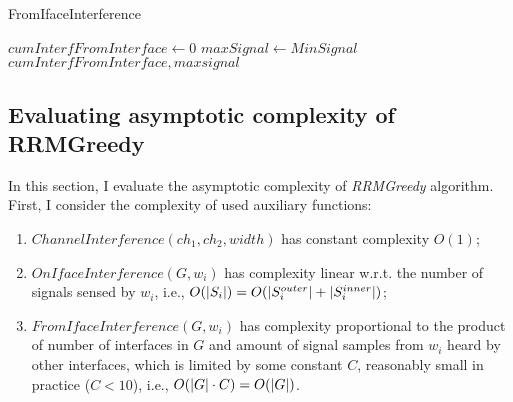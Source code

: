 \begin{algorithm}[hbpt]
\caption{FromIfaceInterference}
\label{rrm:fromifaceinterf}
\DontPrintSemicolon
{}

$cumInterfFromInterface \gets 0$\;
$maxSignal \gets MinSignal$\;
\Return $cumInterfFromInterface, maxsignal$\;
\end{algorithm}

\subsection{Evaluating asymptotic complexity of RRMGreedy}
\label{chapter:research:sec:rrmgreedy:subsec:complexity}
In this section, I evaluate the asymptotic complexity of \textit{RRMGreedy} algorithm.
First, I consider the complexity of used auxiliary functions:
\begin{enumerate}
    \item $ChannelInterference(ch_1, ch_2, width)$ has constant complexity $O(1)$;
    \item $OnIfaceInterference(G, w_i)$ has complexity linear w.r.t. the number of signals sensed by $w_i$, i.e.,
        $O(\lvert{S_i}\rvert) = O(\lvert{S^{outer}_i}\rvert + \lvert{S^{inner}_i}\rvert)$;
    \item $FromIfaceInterference(G, w_i)$ has complexity proportional to the product of number of interfaces in $G$ and amount of signal samples from $w_i$ heard by other interfaces, which is limited by some constant $C$, reasonably small in practice ($C < 10$), i.e.,
        $O(\lvert{G}\rvert \cdot C) = O(\lvert{G}\rvert)$.
\end{enumerate}


